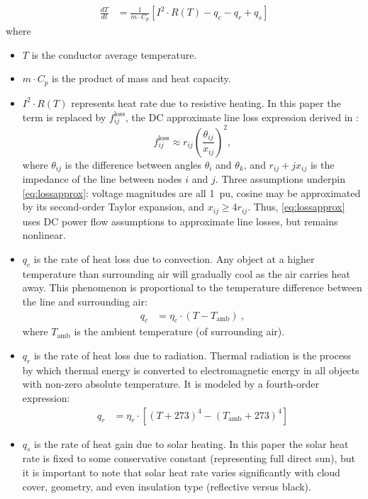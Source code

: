 \documentclass[journal,twoside]{IEEEtran}
\begin{document}
\begin{align}\label{eq:heatbalance}
\frac{dT}{dt} &= \frac{1}{m\cdot C_p}\left[I^2\cdot R(T) - q_c - q_r + q_s \right]
\end{align}
where
\begin{itemize}
	\item $T$ is the conductor average temperature.
	\item $m\cdot C_p$ is the product of mass and heat capacity.
	\item $I^2\cdot R(T)$ represents heat rate due to resistive heating. In this paper the term is replaced by $f_{ij}^\text{loss}$, the DC approximate line loss expression derived in \cite{almassalkhi2014}:
	\begin{equation}
	\label{eq:lossapprox}
	f_{ij}^{\text{loss}} \approx r_{ij}\left(\frac{\theta_{ij}}{x_{ij}}\right)^2,
	\end{equation}
	where $\theta_{ij}$ is the difference between angles
	$\theta_i$ and $\theta_k$, and $r_{ij} +j x_{ij}$ is the impedance of
	the line between nodes $i$ and $j$. Three assumptions underpin
	\eqref{eq:lossapprox}: voltage magnitudes are all 1~pu, cosine may be
	approximated by its second-order Taylor expansion, and $x_{ij} \geq
	4r_{ij}$. Thus, \eqref{eq:lossapprox} uses DC power flow assumptions
	to approximate line losses, but remains nonlinear.
	\item $q_c$ is the rate of heat loss due to convection. Any object at a higher temperature than surrounding air will gradually cool as the air carries heat away. This phenomenon is proportional to the temperature difference between the line and surrounding air:
		\begin{align}\label{eq:qc}
		q_c &= \eta_c\cdot(T - T_\text{amb})~,
		\end{align}
	where $T_\text{amb}$ is the ambient temperature (of surrounding air).
	\item $q_r$ is the rate of heat loss due to radiation. Thermal radiation is the process by which thermal energy is converted to electromagnetic energy in all objects with non-zero absolute temperature. It is modeled by a fourth-order expression:
	  \begin{align}\label{eq:qr}
	    q_r &= \eta_r\cdot\left[(T + 273)^4 - (T_\text{amb} + 273)^4\right]
	  \end{align}
	\item $q_s$ is the rate of heat gain due to solar heating. In this paper the solar heat rate is fixed to some conservative constant (representing full direct sun), but it is important to note that solar heat rate varies significantly with cloud cover, geometry, and even insulation type (reflective versus black).
\end{itemize}
\end{document}
